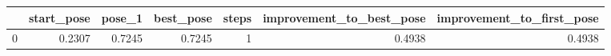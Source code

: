 \begin{tabular}{lrrrrrr}
\toprule
{} &  start\_pose &  pose\_1 &  best\_pose &  steps &  improvement\_to\_best\_pose &  improvement\_to\_first\_pose \\
\midrule
0 &      0.2307 &  0.7245 &     0.7245 &      1 &                    0.4938 &                     0.4938 \\
\bottomrule
\end{tabular}
